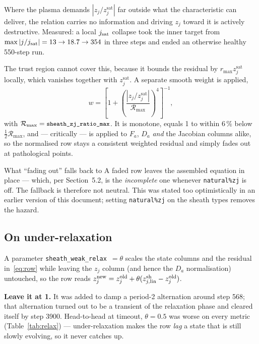 \documentclass[11pt,a4paper]{article}
\newcommand{\zj}{z_j}
\newcommand{\zjsat}{z^{\mathrm{sat}}_{j}}
\newcommand{\code}[1]{\texttt{\small #1}}
\begin{document}
Where the plasma demands $|\zj/\zjsat|$ far outside what the characteristic can deliver, the relation
carries no information and driving $\zj$ toward it is actively destructive. Measured: a local
$j_{\rm sat}$ collapse took the inner target from $\max|j/j_{\rm sat}| = 13 \to 18.7 \to 354$ in three
steps and ended an otherwise healthy 550-step run.

The trust region cannot cover this, because it bounds the residual by $r_{\max}\zjsat$ locally, which
vanishes together with $\zjsat$. A separate smooth weight is applied,
\begin{equation}
  w = \left[1 + \left(\frac{|\zj/\zjsat|}{\mathcal{R}_{\max}}\right)^{4}\right]^{-1},
  \label{eq:weight}
\end{equation}
with $\mathcal{R}_{\max}=\code{sheath\_zj\_ratio\_max}$. It is monotone, equals 1 to within $6\,\%$
below $\tfrac12\mathcal{R}_{\max}$, and --- critically --- is applied to $F_a$, $D_a$ \emph{and} the
Jacobian columns alike, so the normalised row stays a consistent weighted residual and simply fades
out at pathological points.

\begin{warnbox}{What ``fading out'' falls back to}
A faded row leaves the assembled equation in place --- which, per Section~5.2, is the
\emph{incomplete} one whenever \code{natural\%zj} is off. The fallback is therefore not neutral. This
was stated too optimistically in an earlier version of this document; setting \code{natural\%zj} on
the sheath types removes the hazard.
\end{warnbox}

\subsection{On under-relaxation}

A parameter \code{sheath\_weak\_relax}~$=\theta$ scales the state columns and the residual
in~\eqref{eq:row} while leaving the $\zj$ column (and hence the $D_a$ normalisation) untouched, so the
row reads $\zj^{\rm new} = \zj^{\rm old} + \theta(z^{\mathrm{sh}}_{j,\mathrm{lin}}-\zj^{\rm old})$.

\textbf{Leave it at 1.} It was added to damp a period-2 alternation around step 568; that alternation
turned out to be a transient of the relaxation phase and cleared itself by step 3900. Head-to-head at
timeout, $\theta=0.5$ was worse on every metric (Table~\ref{tab:relax}) --- under-relaxation makes the
row \emph{lag} a state that is still slowly evolving, so it never catches up.
\end{document}
